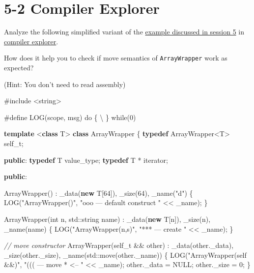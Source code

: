 \documentclass[]{article}
\newenvironment{Shaded}{}{}
\newcommand{\KeywordTok}[1]{\textcolor[rgb]{0.00,0.44,0.13}{\textbf{{#1}}}}
\newcommand{\DataTypeTok}[1]{\textcolor[rgb]{0.56,0.13,0.00}{{#1}}}
\newcommand{\DecValTok}[1]{\textcolor[rgb]{0.25,0.63,0.44}{{#1}}}
\newcommand{\StringTok}[1]{\textcolor[rgb]{0.25,0.44,0.63}{{#1}}}
\newcommand{\CommentTok}[1]{\textcolor[rgb]{0.38,0.63,0.69}{\textit{{#1}}}}
\newcommand{\OtherTok}[1]{\textcolor[rgb]{0.00,0.44,0.13}{{#1}}}
\newcommand{\NormalTok}[1]{{#1}}
\begin{document}
\section{5-2 Compiler Explorer}\label{compiler-explorer}

Analyze the following simplified variant of the
\href{/session-05/01-move/}{example discussed in session 5} in
\href{http://godbolt.org}{compiler explorer}.

How does it help you to check if move semantics of \texttt{ArrayWrapper}
work as expected?

(Hint: You don't need to read assembly)

\begin{Shaded}
\begin{Highlighting}[]
\OtherTok{#include <string>}

\OtherTok{#define LOG(scope, msg) do \{ }\NormalTok{\textbackslash{}}
\OtherTok{\} while(0)}


\KeywordTok{template} \NormalTok{<}\KeywordTok{class} \NormalTok{T>}
\KeywordTok{class} \NormalTok{ArrayWrapper \{}
  \KeywordTok{typedef} \NormalTok{ArrayWrapper<T> self_t;}

\KeywordTok{public}\NormalTok{:}
  \KeywordTok{typedef} \NormalTok{T   value_type;}
  \KeywordTok{typedef} \NormalTok{T * iterator;}

\KeywordTok{public}\NormalTok{:}

  \NormalTok{ArrayWrapper()}
  \NormalTok{: _data(}\KeywordTok{new} \NormalTok{T[}\DecValTok{64}\NormalTok{]),}
    \NormalTok{_size(}\DecValTok{64}\NormalTok{),}
    \NormalTok{_name(}\StringTok{"d"}\NormalTok{) \{}
    \NormalTok{LOG(}\StringTok{"ArrayWrapper()"}\NormalTok{,}
        \StringTok{"ooo --- default construct "} \NormalTok{<< _name);}
  \NormalTok{\}}

  \NormalTok{ArrayWrapper(}\DataTypeTok{int} \NormalTok{n, std::string name)}
  \NormalTok{: _data(}\KeywordTok{new} \NormalTok{T[n]),}
    \NormalTok{_size(n),}
    \NormalTok{_name(name) \{}
    \NormalTok{LOG(}\StringTok{"ArrayWrapper(n,s)"}\NormalTok{,}
        \StringTok{"*** --- create "} \NormalTok{<< _name);}
  \NormalTok{\}}

  \CommentTok{// move constructor}
  \NormalTok{ArrayWrapper(self_t && other)}
      \NormalTok{: _data(other._data),}
        \NormalTok{_size(other._size),}
        \NormalTok{_name(std::move(other._name)) \{}
    \NormalTok{LOG(}\StringTok{"ArrayWrapper(self &&)"}\NormalTok{,}
        \StringTok{"((( --- move  * <-- "} \NormalTok{<< _name);}
    \NormalTok{other._data = NULL;}
    \NormalTok{other._size = }\DecValTok{0}\NormalTok{;}
  \NormalTok{\}}


\end{Highlighting}
\end{Shaded}
\end{document}
